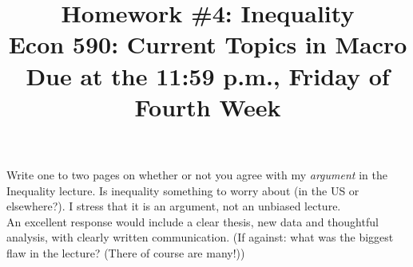 \documentclass[a4paper]{article}
\title{{\Large \bf Homework \#4: Inequality} \\ \small Econ 590: Current Topics in Macro \\ \small Due at the 11:59 p.m., Friday of Fourth Week }
\date{}
\begin{document}
\maketitle
 
\noindent
Write one to two pages on whether or not you agree with my \emph{argument} in the Inequality lecture.  Is inequality something to worry about (in the US or elsewhere?). I stress that it is an argument, not an unbiased lecture.\\

An excellent response would include a clear thesis, new data and thoughtful analysis, with clearly written communication.  (If against: what was the biggest flaw in the lecture? (There of course are many!))\\
\end{document}
